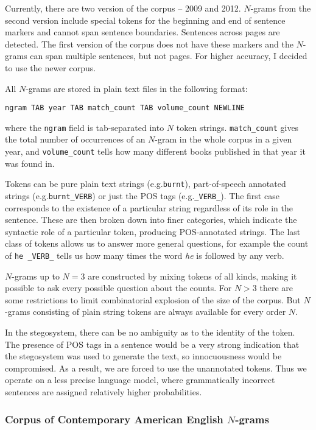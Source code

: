 \documentclass[draft]{IIBproject}
\makeatletter
\DeclareRobustCommand*{\eg}{e.g.\@\xspace}
\makeatother
\begin{document}
Currently, there are two version of the corpus -- 2009 and 2012. $N$-grams from the second version include special tokens for the beginning and end of sentence markers and cannot span sentence boundaries. Sentences across pages are detected. The first version of the corpus does not have these markers and the $N$-grams can span multiple sentences, but not pages. For higher accuracy, I decided to use the newer corpus.

All $N$-grams are stored in plain text files in the following format:

\centerline{\texttt{ngram TAB year TAB match\_count TAB volume\_count NEWLINE}}

where the \texttt{ngram} field is tab-separated into $N$ token strings. \texttt{match\_count} gives the total number of occurrences of an $N$-gram in the whole corpus in a given year, and \texttt{volume\_count} tells how many different books published in that year it was found in.

Tokens can be pure plain text strings (\eg \texttt{burnt}), part-of-speech annotated strings (\eg \texttt{burnt\_VERB}) or just the POS tags (\eg \texttt{\_VERB\_}). The first case corresponds to the existence of a particular string regardless of its role in the sentence. These are then broken down into finer categories, which indicate the syntactic role of a particular token, producing POS-annotated strings. The last class of tokens allows us to answer more general questions, for example the count of \mbox{\texttt{he \_VERB\_}} tells us how many times the word \emph{he} is followed by any verb.

$N$-grams up to $N=3$ are constructed by mixing tokens of all kinds, making it possible to ask every possible question about the counts. For $N > 3$ there are some restrictions to limit combinatorial explosion of the size of the corpus. But $N$-grams consisting of plain string tokens are always available for every order $N$.

In the stegosystem, there can be no ambiguity as to the identity of the token. The presence of POS tags in a sentence would be a very strong indication that the stegosystem was used to generate the text, so innocuousness would be compromised. As a result, we are forced to use the unannotated tokens. Thus we operate on a less precise language model, where grammatically incorrect sentences are assigned relatively higher probabilities.

\subsubsection{Corpus of Contemporary American English $N$-grams}
\label{sec:coca}
\end{document}

